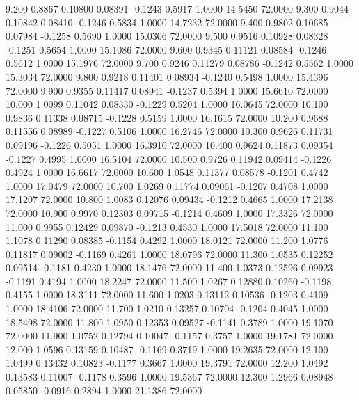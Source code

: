    9.200   0.8867   0.10800   0.08391  -0.1243   0.5917   1.0000  14.5450  72.0000
   9.300   0.9044   0.10842   0.08410  -0.1246   0.5834   1.0000  14.7232  72.0000
   9.400   0.9802   0.10685   0.07984  -0.1258   0.5690   1.0000  15.0306  72.0000
   9.500   0.9516   0.10928   0.08328  -0.1251   0.5654   1.0000  15.1086  72.0000
   9.600   0.9345   0.11121   0.08584  -0.1246   0.5612   1.0000  15.1976  72.0000
   9.700   0.9246   0.11279   0.08786  -0.1242   0.5562   1.0000  15.3034  72.0000
   9.800   0.9218   0.11401   0.08934  -0.1240   0.5498   1.0000  15.4396  72.0000
   9.900   0.9355   0.11417   0.08941  -0.1237   0.5394   1.0000  15.6610  72.0000
  10.000   1.0099   0.11042   0.08330  -0.1229   0.5204   1.0000  16.0645  72.0000
  10.100   0.9836   0.11338   0.08715  -0.1228   0.5159   1.0000  16.1615  72.0000
  10.200   0.9688   0.11556   0.08989  -0.1227   0.5106   1.0000  16.2746  72.0000
  10.300   0.9626   0.11731   0.09196  -0.1226   0.5051   1.0000  16.3910  72.0000
  10.400   0.9624   0.11873   0.09354  -0.1227   0.4995   1.0000  16.5104  72.0000
  10.500   0.9726   0.11942   0.09414  -0.1226   0.4924   1.0000  16.6617  72.0000
  10.600   1.0548   0.11377   0.08578  -0.1201   0.4742   1.0000  17.0479  72.0000
  10.700   1.0269   0.11774   0.09061  -0.1207   0.4708   1.0000  17.1207  72.0000
  10.800   1.0083   0.12076   0.09434  -0.1212   0.4665   1.0000  17.2138  72.0000
  10.900   0.9970   0.12303   0.09715  -0.1214   0.4609   1.0000  17.3326  72.0000
  11.000   0.9955   0.12429   0.09870  -0.1213   0.4530   1.0000  17.5018  72.0000
  11.100   1.1078   0.11290   0.08385  -0.1154   0.4292   1.0000  18.0121  72.0000
  11.200   1.0776   0.11817   0.09002  -0.1169   0.4261   1.0000  18.0796  72.0000
  11.300   1.0535   0.12252   0.09514  -0.1181   0.4230   1.0000  18.1476  72.0000
  11.400   1.0373   0.12596   0.09923  -0.1191   0.4194   1.0000  18.2247  72.0000
  11.500   1.0267   0.12880   0.10260  -0.1198   0.4155   1.0000  18.3111  72.0000
  11.600   1.0203   0.13112   0.10536  -0.1203   0.4109   1.0000  18.4106  72.0000
  11.700   1.0210   0.13257   0.10704  -0.1204   0.4045   1.0000  18.5498  72.0000
  11.800   1.0950   0.12353   0.09527  -0.1141   0.3789   1.0000  19.1070  72.0000
  11.900   1.0752   0.12794   0.10047  -0.1157   0.3757   1.0000  19.1781  72.0000
  12.000   1.0596   0.13159   0.10487  -0.1169   0.3719   1.0000  19.2635  72.0000
  12.100   1.0499   0.13432   0.10823  -0.1177   0.3667   1.0000  19.3791  72.0000
  12.200   1.0492   0.13583   0.11007  -0.1178   0.3596   1.0000  19.5367  72.0000
  12.300   1.2966   0.08948   0.05850  -0.0916   0.2894   1.0000  21.1386  72.0000
